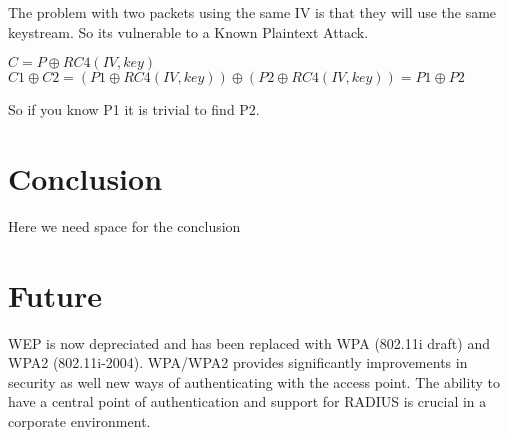 \documentclass[twocolumn]{IEEEtran}
\begin{document}
The problem with two packets using the same IV is that they will use the same keystream. So its vulnerable to a Known Plaintext Attack.

$C = P \oplus RC4(IV,key)$ \\
$C1 \oplus C2 = (P1 \oplus RC4(IV,key) ) \oplus ( P2 \oplus RC4(IV,key)) = P1 \oplus P2 $

So if you know P1 it is trivial to find P2. 

\section {Conclusion}
\label{sec:conclusion}

Here we need space for the conclusion



\section {Future}
\label{sec:future}

WEP is now depreciated and has been replaced with WPA (802.11i draft) and WPA2 (802.11i-2004). WPA/WPA2 provides significantly improvements in security as well new ways of authenticating with the access point. The ability to have a central point  of authentication and support for RADIUS is crucial in a corporate environment.






\end{document}
